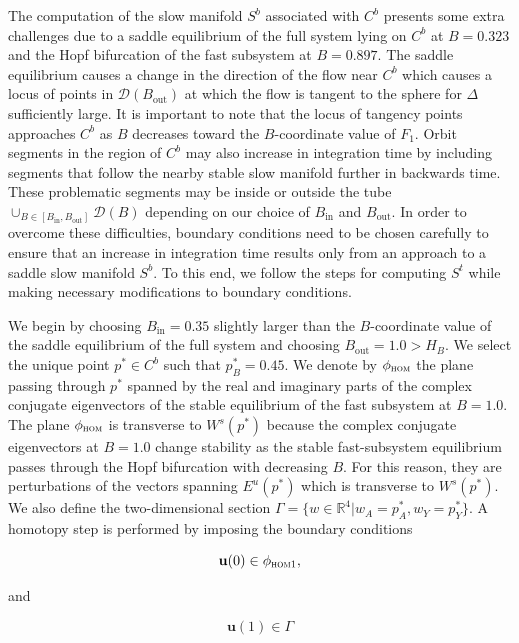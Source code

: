 \documentclass{ws-ijbc}
\begin{document}
The computation of the slow manifold $S^b$ associated with $C^b$ presents some extra challenges due to a saddle equilibrium of the full system lying on $C^b$ at $B = 0.323$ and the Hopf bifurcation of the fast subsystem at $B = 0.897$.  The saddle equilibrium causes a change in the direction of the flow near $C^b$ which causes a locus of points in $\mathscr{D}(B_{\mathrm{out}})$ at which the flow is tangent to the sphere for $\Delta$ sufficiently large.  It is important to note that the locus of tangency points approaches $C^b$ as $B$ decreases toward the $B$-coordinate value of $F_1$.  Orbit segments in the region of $C^b$ may also increase in integration time by including segments that follow the nearby stable slow manifold further in backwards time.  These problematic segments may be inside or outside the tube $\cup_{B \in [B_{\mathrm{in}},B_{\mathrm{out}}]}\mathscr{D}(B)$ depending on our choice of $B_{\mathrm{in}}$ and $B_{\mathrm{out}}$.  In order to overcome these difficulties, boundary conditions need to be chosen carefully to ensure that an increase in integration time results only from an approach to a saddle slow manifold $S^b$.  To this end, we follow the steps for computing $S^t$ while making necessary modifications to boundary conditions.

We begin by choosing $B_{\mathrm{in}} = 0.35$ slightly larger than the $B$-coordinate value of the saddle equilibrium of the full system and choosing $B_{\mathrm{out}}=1.0 > H_B$.  We select the unique point $p^* \in C^b$ such that $p^*_B = 0.45$.  We denote by $\phi_{\textsc{hom}}$ the plane passing through $p^*$ spanned by the real and imaginary parts of the complex conjugate eigenvectors of the stable equilibrium of the fast subsystem at $B=1.0$.  The plane $\phi_{\textsc{hom}}$ is transverse to $W^s(p^*)$ because the complex conjugate eigenvectors at $B=1.0$ change stability as the stable fast-subsystem equilibrium passes through the Hopf bifurcation with decreasing $B$.  For this reason, they are perturbations of the vectors spanning $E^u(p^*)$ which is transverse to $W^s(p^*)$.  We also define the two-dimensional section $\Gamma = \{ w \in \mathbb{R}^4 | w_A=p^*_A, w_Y=p^*_Y \}$.  A homotopy step is performed by imposing the boundary conditions

\begin{equation}
\mathbf{u}(0) \in \phi_{\textsc{hom1}},
\label{BC_unstable1}
\end{equation}

and

\begin{equation}
\mathbf{u}(1) \in \Gamma
\label{BC_unstable2}
\end{equation}
\end{document}
